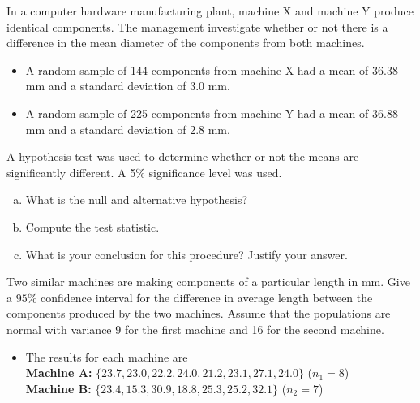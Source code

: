 \item 
In a computer hardware manufacturing plant, machine X and machine Y
produce identical components. The management investigate whether or
not there is a difference in the mean diameter of the components from
both machines.
\begin{itemize}
\item A random sample of 144 components from machine X had a mean of
36.38 mm and a standard deviation of 3.0 mm.
\item  A random sample of 225 components from machine Y had a mean of
36.88 mm and a standard deviation of 2.8 mm.
\end{itemize}
A hypothesis test was used to determine whether or not the means are
significantly different. A 5\% significance level was used.
\begin{enumerate}[(a)]
\item What is the null and alternative hypothesis?
\item Compute the test statistic.
\item What is your conclusion for this procedure? Justify your
answer.
\end{enumerate}

\item Two similar machines are making components of a particular length
in mm. Give a $95\%$ confidence interval for the difference in average length between
the components produced by the two machines. Assume that the populations are normal
with variance 9 for the first machine and 16 for the second machine.
\begin{itemize}
\item The results for each machine are\\ \bigskip
\textbf{Machine A:} $\{ 23.7, 23.0, 22.2, 24.0, 21.2, 23.1, 27.1, 24.0 \}   $ ($n_1= 8$)\\ \bigskip
\textbf{Machine B:} $\{23.4, 15.3, 30.9, 18.8, 25.3, 25.2, 32.1\}$  ($n_2=7$) \\
\end{itemize}


